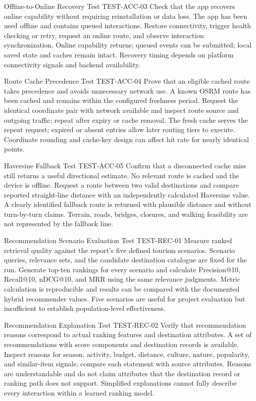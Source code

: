 \EvidenceSheet
{Offline-to-Online Recovery Test}
{TEST-ACC-03}
{Check that the app recovers online capability without requiring reinstallation or data loss.}
{The app has been used offline and contains queued interactions.}
{Restore connectivity, trigger health checking or retry, request an online route, and observe interaction synchronization.}
{Online capability returns; queued events can be submitted; local saved state and caches remain intact.}
{Recovery timing depends on platform connectivity signals and backend availability.}

\EvidenceSheet
{Route Cache Precedence Test}
{TEST-ACC-04}
{Prove that an eligible cached route takes precedence and avoids unnecessary network use.}
{A known OSRM route has been cached and remains within the configured freshness period.}
{Request the identical coordinate pair with network available and inspect route source and outgoing traffic; repeat after expiry or cache removal.}
{The fresh cache serves the repeat request; expired or absent entries allow later routing tiers to execute.}
{Coordinate rounding and cache-key design can affect hit rate for nearly identical points.}

\EvidenceSheet
{Haversine Fallback Test}
{TEST-ACC-05}
{Confirm that a disconnected cache miss still returns a useful directional estimate.}
{No relevant route is cached and the device is offline.}
{Request a route between two valid destinations and compare reported straight-line distance with an independently calculated Haversine value.}
{A clearly identified fallback route is returned with plausible distance and without turn-by-turn claims.}
{Terrain, roads, bridges, closures, and walking feasibility are not represented by the fallback line.}

\EvidenceSheet
{Recommendation Scenario Evaluation Test}
{TEST-REC-01}
{Measure ranked retrieval quality against the report's five defined tourism scenarios.}
{Scenario queries, relevance sets, and the candidate destination catalogue are fixed for the run.}
{Generate top-ten rankings for every scenario and calculate Precision@10, Recall@10, nDCG@10, and MRR using the same relevance judgments.}
{Metric calculation is reproducible and results can be compared with the documented hybrid recommender values.}
{Five scenarios are useful for project evaluation but insufficient to establish population-level effectiveness.}

\EvidenceSheet
{Recommendation Explanation Test}
{TEST-REC-02}
{Verify that recommendation reasons correspond to actual ranking features and destination attributes.}
{A set of recommendations with score components and destination records is available.}
{Inspect reasons for season, activity, budget, distance, culture, nature, popularity, and similar-item signals; compare each statement with source attributes.}
{Reasons are understandable and do not claim attributes that the destination record or ranking path does not support.}
{Simplified explanations cannot fully describe every interaction within a learned ranking model.}

